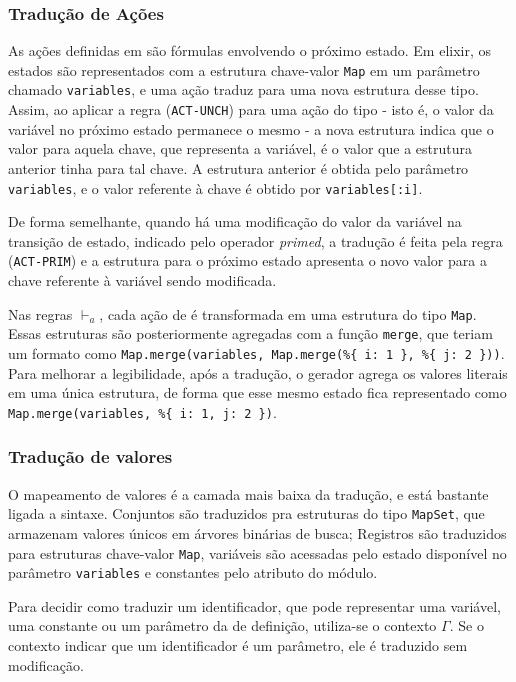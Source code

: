\subsubsection{Tradução de Ações}

As ações definidas em \TLA são fórmulas envolvendo o próximo estado. Em elixir,
os estados são representados com a estrutura chave-valor \texttt{Map} em um parâmetro chamado \texttt{variables}, e uma
ação traduz para uma nova estrutura desse tipo. Assim, ao aplicar a regra (\texttt{ACT-UNCH}) para uma ação do
tipo \UNCHANGED - isto é, o valor da variável no próximo estado permanece o
mesmo - a nova estrutura indica que o valor para aquela chave, que representa a
variável, é o valor que a estrutura anterior tinha para tal chave. A
estrutura anterior é obtida pelo parâmetro \texttt{variables}, e o valor referente à
chave \tti é obtido por \texttt{variables[:i]}.

De forma semelhante, quando há uma modificação do valor da variável na transição
de estado, indicado pelo operador \textit{primed}, a tradução é feita pela regra
(\texttt{ACT-PRIM}) e a estrutura para o próximo estado apresenta o
novo valor para a chave referente à variável sendo modificada.

Nas regras $\vdash_a$, cada ação de \TLA é transformada em uma estrutura do tipo
\texttt{Map}. Essas estruturas são posteriormente agregadas com a função
\texttt{merge}, que teriam um formato como \texttt{Map.merge(variables, Map.merge(\%\{ i: 1 \}, \%\{
  j: 2 \}))}. Para melhorar a legibilidade, após a tradução, o gerador agrega os
valores literais em uma única estrutura, de forma que esse mesmo estado fica
representado como \texttt{Map.merge(variables, \%\{ i: 1, j: 2 \})}.

\subsubsection{Tradução de valores}



O mapeamento de valores é a camada mais baixa da tradução, e está bastante
ligada a sintaxe. Conjuntos são traduzidos pra estruturas do tipo
\texttt{MapSet}, que armazenam valores únicos em árvores binárias de busca;
Registros são traduzidos para estruturas chave-valor \texttt{Map}, variáveis
são acessadas pelo estado disponível no parâmetro \texttt{variables} e
constantes pelo atributo do módulo.

Para decidir como traduzir um identificador, que pode representar uma variável,
uma constante ou um parâmetro da de definição, utiliza-se o contexto $\Gamma$.
Se o contexto indicar que um identificador é um parâmetro, ele é traduzido sem
modificação.


